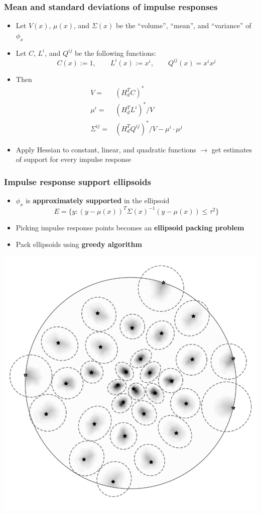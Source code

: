 \documentclass[10pt,final,xcolor=dvipsnames,aspect ratio=169]{beamer}
\begin{document}
\begin{frame}
	\frametitle{Mean and standard deviations of impulse responses}
	\begin{itemize}
		\setlength\itemsep{2em}
		\item Let $V(x)$, $\mu(x)$, and $\Sigma(x)$ be the ``volume'', ``mean'', and ``variance'' of $\phi_x$
		\item Let $C$, $L^i$, and $Q^{ij}$ be the following functions:
		\begin{equation*}
		C(x) := 1, \qquad
		L^i(x) := x^i, \qquad
		Q^{ij}(x) = x^i x^j
		\end{equation*}
		\item Then
		\begin{align*}
		V =& \left(H_d^T C\right)^* \\
		\mu^i =& \left(H_d^T L^i\right)^* / V \\
		\Sigma^{ij} =& \left(H_d^T Q^{ij}\right)^* / V - \mu^i\cdot \mu^j
		\end{align*}
		\item Apply Hessian to constant, linear, and quadratic functions $\rightarrow$ get estimates of support for every impulse response
	\end{itemize}
	
\end{frame}
\begin{frame}
	\frametitle{Impulse response support ellipsoids}
	\begin{itemize}
		\item $\phi_x$ is \textbf{approximately supported} in the ellipsoid
		$$E = \{y: (y - \mu(x))^T\Sigma(x)^{-1}(y - \mu(x)) \le \tau^2\}$$
		
		\item Picking impulse response points becomes an \textbf{ellipsoid packing problem}
		
		\item Pack ellipsoids using \textbf{greedy algorithm}
	\end{itemize}
	\begin{center}
		\includegraphics[width=0.5\columnwidth]{impulse_batch2.png} 
	\end{center}
\end{frame}
\end{document}
